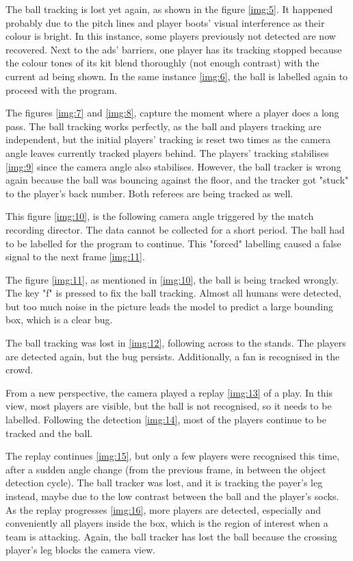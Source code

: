 \documentclass[
    11pt,
    oneside
]{report}
\begin{document}
The ball tracking is lost yet again, as shown in the figure \ref{img:5}. It happened probably due to the pitch lines and player boots' visual interference as their colour is bright. In this instance, some players previously not detected are now recovered. Next to the ads' barriers, one player has its tracking stopped because the colour tones of its kit blend thoroughly (not enough contrast) with the current ad being shown. In the same instance \ref{img:6}, the ball is labelled again to proceed with the program.



The figures \ref{img:7} and \ref{img:8}, capture the moment where a player does a long pass. The ball tracking works perfectly, as the ball and players tracking are independent, but the initial players' tracking is reset two times as the camera angle leaves currently tracked players behind.
The players' tracking stabilises \ref{img:9} since the camera angle also stabilises. However, the ball tracker is wrong again because the ball was bouncing against the floor, and the tracker got "stuck" to the player's back number. Both referees are being tracked as well.



This figure \ref{img:10}, is the following camera angle triggered by the match recording director. The data cannot be collected for a short period. The ball had to be labelled for the program to continue. This "forced" labelling caused a false signal to the next frame \ref{img:11}.



The figure \ref{img:11}, as mentioned in \ref{img:10}, the ball is being tracked wrongly. The key "f" is pressed to fix the ball tracking. Almost all humans were detected, but too much noise in the picture leads the model to predict a large bounding box, which is a clear bug.


The ball tracking was lost in \ref{img:12}, following across to the stands. The players are detected again, but the bug persists. Additionally, a fan is recognised in the crowd.



From a new perspective, the camera played a replay \ref{img:13} of a play. In this view, most players are visible, but the ball is not recognised, so it needs to be labelled. Following the detection \ref{img:14}, most of the players continue to be tracked and the ball.




The replay continues \ref{img:15}, but only a few players were recognised this time, after a sudden angle change (from the previous frame, in between the object detection cycle). The ball tracker was lost, and it is tracking the payer's leg instead, maybe due to the low contrast between the ball and the player's socks. As the replay progresses \ref{img:16}, more players are detected, especially and conveniently all players inside the box, which is the region of interest when a team is attacking. Again, the ball tracker has lost the ball because the crossing player's leg blocks the camera view.
\end{document}
